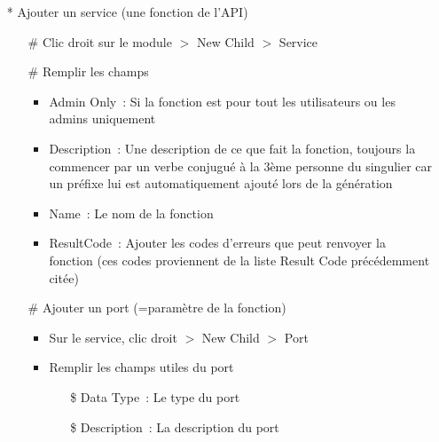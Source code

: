 \documentclass{article}
\begin{document}
\begin{itemize}
\begin{itemize}
  \item[\#] Clic droit $>$ New child $>$ Result code list
  \item[\#] Ajouter un type de retour \`a la result code list
    \begin{itemize}
    \item Clic droit $>$ New Child $>$ Result code
    \item Remplir les champs 
      \begin{itemize}
      \item[\$] Description~: Description du code de retour
      \item[\$] Name~: Nom du code de retour
      \item[\$] Value~: Valeur du code de retour
      \end{itemize}
    \end{itemize}
  \end{itemize}
\item[*] Ajouter un service (une fonction de l'API)
  \begin{itemize}
  \item[\#] Clic droit sur le module $>$ New Child $>$ Service
  \item[\#] Remplir les champs
    \begin{itemize}
    \item Admin Only~: Si la fonction est pour tout les utilisateurs ou les admins uniquement
    \item Description~: Une description de ce que fait la fonction, toujours la commencer par un verbe conjugu\'e \`a la 3\`eme personne du singulier car un pr\'efixe lui est automatiquement ajout\'e lors de la g\'en\'eration
    \item Name~: Le nom de la fonction
    \item ResultCode~: Ajouter les codes d'erreurs que peut renvoyer la fonction (ces codes proviennent de la liste Result Code pr\'ec\'edemment cit\'ee)
    \end{itemize}
  \item[\#] Ajouter un port (=param\`etre de la fonction)
    \begin{itemize}
    \item Sur le service, clic droit $>$ New Child $>$ Port
    \item Remplir les champs utiles du port
      \begin{itemize}
      \item[\$] Data Type~: Le type du port
      \item[\$] Description~: La description du port

\end{itemize}
\end{itemize}
\end{itemize}
\end{itemize}
\end{document}
